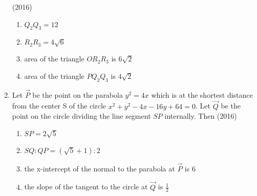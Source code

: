 \begin{enumerate}[label=\thesubsection.\arabic*.,ref=\thesubsection.\theenumi]
	      \hfill(2016)
	      
\begin{enumerate}
		      \item $Q_2Q_3=12$
		      \item $R_2R_3=4\sqrt{6}$
		      \item area of the triangle $OR_2R_3$ is $6\sqrt{2}$
		      \item area of the triangle $PQ_2Q_3$ is $4\sqrt{2}$
	       \end{enumerate}
      \item Let $\vec{P}$ be the point on the parabola $y^2=4x$ which is at the shortest distance from the center S of the circle $x^2+y^2-4x-16y+64=0$. Let $\vec{Q}$ be the point on the circle
	      dividing the line segment $SP$ internally. Then 
	      \hfill(2016)
	       \begin{multicols}{2}
\begin{enumerate}
		      \item $SP=2\sqrt{5}$
		      \item $SQ:QP=(\sqrt{5}+1):2$
		      \item the x-intercept of the normal to the parabola at $\vec{P}$ is $6$
		      \item the slope of the tangent to the circle at $\vec{Q}$ is $\frac{1}{2}$
		      

\end{enumerate}
\end{multicols}
\end{enumerate}
